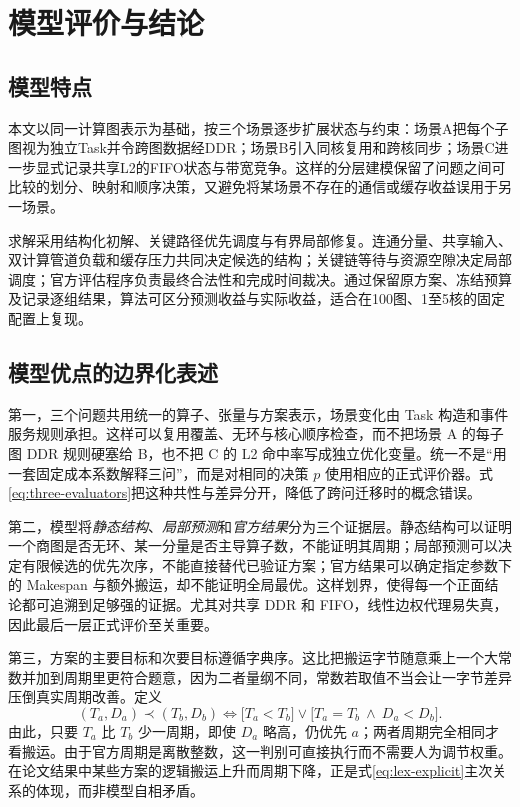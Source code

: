 \section{模型评价与结论}
\subsection{模型特点}
本文以同一计算图表示为基础，按三个场景逐步扩展状态与约束：场景A把每个子图视为独立Task并令跨图数据经DDR；场景B引入同核复用和跨核同步；场景C进一步显式记录共享L2的FIFO状态与带宽竞争。这样的分层建模保留了问题之间可比较的划分、映射和顺序决策，又避免将某场景不存在的通信或缓存收益误用于另一场景。

求解采用结构化初解、关键路径优先调度与有界局部修复。连通分量、共享输入、双计算管道负载和缓存压力共同决定候选的结构；关键链等待与资源空隙决定局部调度；官方评估程序负责最终合法性和完成时间裁决。通过保留原方案、冻结预算及记录逐组结果，算法可区分预测收益与实际收益，适合在100图、1至5核的固定配置上复现。

\subsection{模型优点的边界化表述}
第一，三个问题共用统一的算子、张量与方案表示，场景变化由 Task 构造和事件服务规则承担。这样可以复用覆盖、无环与核心顺序检查，而不把场景 A 的每子图 DDR 规则硬塞给 B，也不把 C 的 L2 命中率写成独立优化变量。统一不是“用一套固定成本系数解释三问”，而是对相同的决策 $p$ 使用相应的正式评价器。式\eqref{eq:three-evaluators}把这种共性与差异分开，降低了跨问迁移时的概念错误。

第二，模型将\emph{静态结构}、\emph{局部预测}和\emph{官方结果}分为三个证据层。静态结构可以证明一个商图是否无环、某一分量是否主导算子数，不能证明其周期；局部预测可以决定有限候选的优先次序，不能直接替代已验证方案；官方结果可以确定指定参数下的 Makespan 与额外搬运，却不能证明全局最优。这样划界，使得每一个正面结论都可追溯到足够强的证据。尤其对共享 DDR 和 FIFO，线性边权代理易失真，因此最后一层正式评价至关重要。

第三，方案的主要目标和次要目标遵循字典序。这比把搬运字节随意乘上一个大常数并加到周期里更符合题意，因为二者量纲不同，常数若取值不当会让一字节差异压倒真实周期改善。定义
\begin{equation}\label{eq:lex-explicit}
(T_a,D_a)\prec(T_b,D_b)
\iff
\bigl[T_a<T_b\bigr]\lor
\bigl[T_a=T_b\ \land\ D_a<D_b\bigr].
\end{equation}
由此，只要 $T_a$ 比 $T_b$ 少一周期，即使 $D_a$ 略高，仍优先 $a$；两者周期完全相同才看搬运。由于官方周期是离散整数，这一判别可直接执行而不需要人为调节权重。在论文结果中某些方案的逻辑搬运上升而周期下降，正是式\eqref{eq:lex-explicit}主次关系的体现，而非模型自相矛盾。

